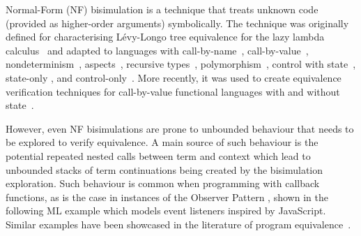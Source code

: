 Normal-Form (NF) bisimulation is a technique that treats unknown code (provided as higher-order arguments) symbolically.
The technique was originally defined for characterising L\'evy-Longo tree equivalence for the lazy lambda calculus~\cite{Sangiorgi:lazylambda} and adapted to languages with call-by-name~\cite{LassenHNF}, call-by-value~\cite{LassenENFB}, nondeterminism~\cite{LassenNondet}, aspects~\cite{JagadeesanPitcherRiely:aspects}, recursive types~\cite{LassenL07}, polymorphism~\cite{LassenLevy:nfbisimpoly}, control with state~\cite{StorvingLassenPOPL07}, state-only \cite{BiernackiLP19}, and control-only~\cite{BiernackiLengletNFB2}. More recently, it was used to create equivalence verification techniques for call-by-value functional languages with and without state~\cite{KoutavasLT22,KoutavasLT23}.

However, even NF bisimulations are prone to unbounded behaviour that needs to be explored to verify equivalence. A main source of such behaviour is the potential repeated nested calls between term and context which lead to unbounded stacks of term continuations being created by the bisimulation {exploration}. %
Such behaviour is common when programming with callback functions, as is the case in instances of the Observer Pattern \cite{design-patterns-book}, shown in the following ML example which models event listeners inspired by JavaScript. Similar examples have been showcased in the literature of program equivalence~\cite{DreyerNB10}.

